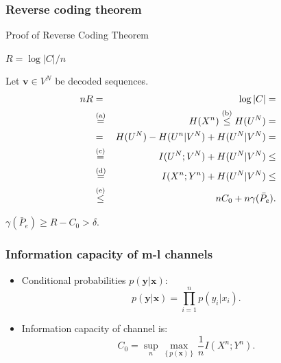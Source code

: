 \documentclass[14pt]{beamer}
\renewcommand{\vec}[1]{\ensuremath{\boldsymbol{#1}}}
\begin{document}
\begin{frame}
\frametitle{Reverse coding theorem}
 Proof of Reverse Coding Theorem
\begin{itemize}
\small{

   
    \item $R=\log |C|/n$
    
    \item Let $\vec v \in V^N $  be decoded sequences.
    \begin{eqnarray*} 
    n R &=& \log|C|=  \\
      &\stackrel{\rm (a)}{=}& H(X^n)\stackrel{\rm (b)}{\le}  H(U^N) =\\
      &=& H(U^N)-H(U^n|V^N)+H(U^N|V^N)=\\
      &\stackrel{\rm (c)}{=}& I(U^N;V^N)+H(U^N|V^N)\le \\
      &\stackrel{\rm (d)}{=}& I(X^n;Y^n)+H(U^N|V^N)\le \\
      &\stackrel{\rm (e)}{\le}&n C_0+n\gamma(\bar {P}_e).
    \end{eqnarray*}
    
    \item $\gamma(\bar {P}_e) \ge R-C_0 > \delta$.
    
}
\end{itemize}
\end{frame}



\begin{frame}
\frametitle{Information capacity of m-l channels}
\begin{itemize}

    \item Conditional probabilities $p({\vec y}\vert {\vec x})$:
    \begin{equation}
    \label{eq5_33} p({\vec y}\vert {\vec x}) = \prod\limits_{i = 1}^n
    {p(y_i \vert x_i )} .
    \end{equation}
    
    \item Information capacity of channel is:
    \begin{equation}
    \label{eq5_34}
    C_0 = \mathop {\sup }\limits_n \mathop {\max }%
    \limits_{\left\{ {p({\vec x})} \right\}} \frac{1}{n}I(X^n;Y^n).
    \end{equation}
    


\end{itemize}
\end{frame}
\end{document}
